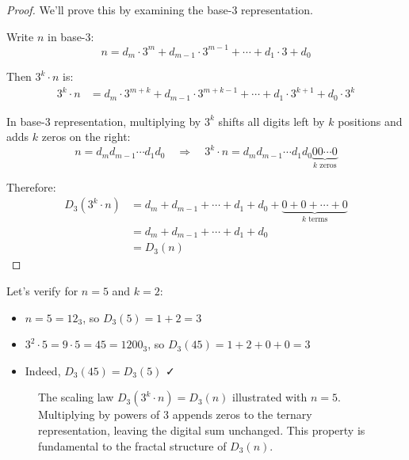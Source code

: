 \begin{proof}
We'll prove this by examining the base-3 representation.

Write $n$ in base-3:
\begin{equation}
n = d_m \cdot 3^m + d_{m-1} \cdot 3^{m-1} + \cdots + d_1 \cdot 3 + d_0
\end{equation}

Then $3^k \cdot n$ is:
\begin{align}
3^k \cdot n &= d_m \cdot 3^{m+k} + d_{m-1} \cdot 3^{m+k-1} + \cdots + d_1 \cdot 3^{k+1} + d_0 \cdot 3^k
\end{align}

In base-3 representation, multiplying by $3^k$ shifts all digits left by $k$ positions and adds $k$ zeros on the right:
\begin{equation}
n = d_m d_{m-1} \cdots d_1 d_0 \quad \Rightarrow \quad 3^k \cdot n = d_m d_{m-1} \cdots d_1 d_0 \underbrace{00\cdots0}_{k \text{ zeros}}
\end{equation}

Therefore:
\begin{align}
D_3(3^k \cdot n) &= d_m + d_{m-1} + \cdots + d_1 + d_0 + \underbrace{0 + 0 + \cdots + 0}_{k \text{ terms}} \\
&= d_m + d_{m-1} + \cdots + d_1 + d_0 \\
&= D_3(n)
\end{align}
\end{proof}

\begin{example}
Let's verify for $n = 5$ and $k = 2$:

\begin{itemize}
\item $n = 5 = 12_3$, so $D_3(5) = 1 + 2 = 3$
\item $3^2 \cdot 5 = 9 \cdot 5 = 45 = 1200_3$, so $D_3(45) = 1 + 2 + 0 + 0 = 3$
\item Indeed, $D_3(45) = D_3(5)$ ✓
\end{itemize}
\end{example}

\begin{figure}[h]
\centering

\caption{The scaling law $D_3(3^k \cdot n) = D_3(n)$ illustrated with $n = 5$. Multiplying by powers of 3 appends zeros to the ternary representation, leaving the digital sum unchanged. This property is fundamental to the fractal structure of $D_3(n)$.}
\label{fig:scalinglaw}
\end{figure}

